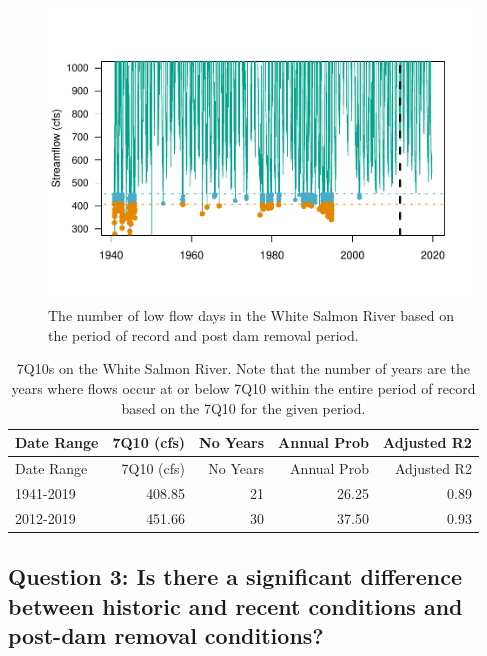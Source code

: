 \documentclass[
  12pt,
]{article}
\begin{document}
\begin{figure}
\centering
\includegraphics{WhiteSalmon_WriteUp_files/figure-latex/fig7-1.pdf}
\caption{The number of low flow days in the White Salmon River based on
the period of record and post dam removal period.}
\end{figure}

\begin{longtable}[]{@{}lrrrr@{}}
\caption{7Q10s on the White Salmon River. Note that the number of years
are the years where flows occur at or below 7Q10 within the entire
period of record based on the 7Q10 for the given period.}\tabularnewline
\toprule
Date Range & 7Q10 (cfs) & No Years & Annual Prob & Adjusted
R2\tabularnewline
\midrule
\endfirsthead
\toprule
Date Range & 7Q10 (cfs) & No Years & Annual Prob & Adjusted
R2\tabularnewline
\midrule
\endhead
1941-2019 & 408.85 & 21 & 26.25 & 0.89\tabularnewline
2012-2019 & 451.66 & 30 & 37.50 & 0.93\tabularnewline
\bottomrule
\end{longtable}

\hypertarget{question-3-is-there-a-significant-difference-between-historic-and-recent-conditions-and-post-dam-removal-conditions}{%
\subsection{Question 3: Is there a significant difference between
historic and recent conditions and post-dam removal
conditions?}\label{question-3-is-there-a-significant-difference-between-historic-and-recent-conditions-and-post-dam-removal-conditions}}
\end{document}
